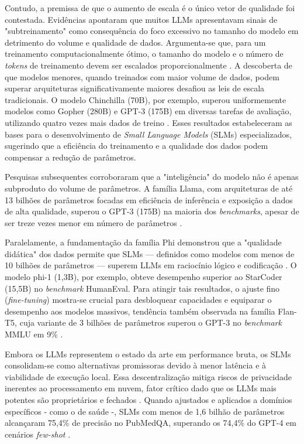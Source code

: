 \documentclass[
	12pt,				%
	openright,			%
	oneside,			%
	a4paper,			%
	dissertacao,			%
	]{ABNT-DC-UEL}
\begin{document}
Contudo, a premissa de que o aumento de escala é o único vetor de qualidade foi contestada. Evidências apontaram que muitos LLMs apresentavam sinais de "subtreinamento" como consequência do foco excessivo no tamanho do modelo em detrimento do volume e qualidade de dados. Argumenta-se que, para um treinamento computacionalmente ótimo, o tamanho do modelo e o número de \textit{tokens} de treinamento devem ser escalados proporcionalmente \cite{hoffmann2022}. A descoberta de que modelos menores, quando treinados com maior volume de dados, podem superar arquiteturas significativamente maiores desafiou as leis de escala tradicionais. O modelo Chinchilla (70B), por exemplo, superou uniformemente modelos como Gopher (280B) e GPT-3 (175B) em diversas tarefas de avaliação, utilizando quatro vezes mais dados de treino \cite{hoffmann2022}. Esses resultados estabeleceram as bases para o desenvolvimento de \textit{Small Language Models} (SLMs) especializados, sugerindo que a eficiência do treinamento e a qualidade dos dados podem compensar a redução de parâmetros.

Pesquisas subsequentes corroboraram que a "inteligência" do modelo não é apenas subproduto do volume de parâmetros. A família Llama, com arquiteturas de até 13 bilhões de parâmetros focadas em eficiência de inferência e exposição a dados de alta qualidade, superou o GPT-3 (175B) na maioria dos \textit{benchmarks}, apesar de ser treze vezes menor em número de parâmetros \cite{touvron2023}.

Paralelamente, a fundamentação da família Phi demonstrou que a "qualidade didática" dos dados permite que SLMs — definidos como modelos com menos de 10 bilhões de parâmetros — superem LLMs em raciocínio lógico e codificação \cite{gunasekar2023}. O modelo phi-1 (1,3B), por exemplo, obteve desempenho superior ao StarCoder (15,5B) no \textit{benchmark} HumanEval. Para atingir tais resultados, o ajuste fino (\textit{fine-tuning}) mostra-se crucial para desbloquear capacidades e equiparar o desempenho aos modelos massivos, tendência também observada na família Flan-T5, cuja variante de 3 bilhões de parâmetros superou o GPT-3 no \textit{benchmark} MMLU em 9\% \cite{chung2024}.

Embora os LLMs representem o estado da arte em performance bruta, os SLMs consolidam-se como alternativas promissoras devido à menor latência e à viabilidade de execução local. Essa descentralização mitiga riscos de privacidade inerentes ao processamento em nuvem, fator crítico dado que os LLMs mais potentes são proprietários e fechados \cite{wang2025llmsurvey}. Quando ajustados e aplicados a domínios específicos - como o de saúde -, SLMs com menos de 1,6 bilhão de parâmetros alcançaram 75,4\% de precisão no PubMedQA, superando os 74,4\% do GPT-4 em cenários \textit{few-shot} \cite{wang2025llmsurvey}.
\end{document}

